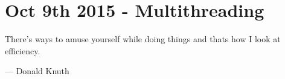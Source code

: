 \section{Oct 9th 2015 - Multithreading}

\epigraph{
There's ways to amuse yourself while doing things and thats how I look at efficiency.}{--- \textup{Donald Knuth}}
